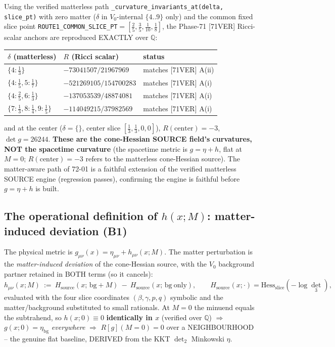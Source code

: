 Using the verified matterless path \texttt{\_curvature\_invariants\_at(delta, slice\_pt)}
with zero matter ($\delta$ in $V_0$-internal $\{4..9\}$ only) and the common fixed
slice point \texttt{ROUTE1\_COMMON\_SLICE\_PT}$=[\tfrac25,\tfrac35,\tfrac1{10},\tfrac18]$,
the Phase-71 [71VER] Ricci-scalar anchors are reproduced EXACTLY over $\mathbb{Q}$:
\begin{center}
\begin{tabular}{lll}
\hline
$\delta$ (matterless) & $R$ (Ricci scalar) & status\\
\hline
$\{4{:}\tfrac13\}$        & $-73041507/21967969$    & matches [71VER] A(ii)\\
$\{4{:}\tfrac15,5{:}\tfrac17\}$ & $-521269105/154700283$  & matches [71VER] A(i)\\
$\{4{:}\tfrac25,6{:}\tfrac13\}$ & $-137053539/48874081$   & matches [71VER] A(i)\\
$\{7{:}\tfrac13,8{:}\tfrac14,9{:}\tfrac15\}$ & $-114049215/37982569$ & matches [71VER] A(i)\\
\hline
\end{tabular}
\end{center}
and at the center ($\delta=\{\}$, center slice $[\tfrac13,\tfrac13,0,0]$),
$R(\text{center})=-3$, $\det g = 26244$. \textbf{These are the cone-Hessian SOURCE
field's curvatures, NOT the spacetime curvature} (the spacetime metric is $g=\eta+h$,
flat at $M=0$; $R(\text{center})=-3$ refers to the matterless cone-Hessian source).
The matter-aware path of 72-01 is a faithful extension of the verified matterless
SOURCE engine (regression passes), confirming the engine is faithful before $g=\eta+h$
is built.

\subsection{The operational definition of $h(x;M)$: matter-induced deviation (B1)}
\label{sec:b1}

The physical metric is $g_{\mu\nu}(x)=\eta_{\mu\nu}+h_{\mu\nu}(x;M)$. The matter
perturbation is the \emph{matter-induced deviation} of the cone-Hessian source, with
the $V_0$ background partner retained in BOTH terms (so it cancels):
\begin{equation}
  h_{\mu\nu}(x;M)\ :=\ H_{\mathrm{source}}(x;\,\mathrm{bg}+M)\ -\
                       H_{\mathrm{source}}(x;\,\mathrm{bg\ only}),
  \qquad H_{\mathrm{source}}(x;\cdot)=\mathrm{Hess}_{\mathrm{slice}}(-\log\det_3),
  \label{eq:B1}
\end{equation}
evaluated with the four slice coordinates $(\beta,\gamma,p,q)$ symbolic and the
matter/background substituted to small rationals. At $M=0$ the minuend equals the
subtrahend, so $h(x;0)\equiv0$ \textbf{identically in $x$} (verified over
$\mathbb{Q}$) $\Rightarrow$ $g(x;0)=\eta_{\mathrm{bg}}$ \emph{everywhere}
$\Rightarrow$ $R[g](M{=}0)=0$ over a NEIGHBOURHOOD -- the genuine flat baseline,
DERIVED from the KKT $\det_2$ Minkowski $\eta$.

